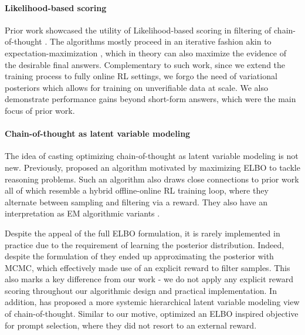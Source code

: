 \documentclass{article}
\theoremstyle{definition}
\begin{document}
\paragraph{Likelihood-based scoring}
Prior work showcased the utility of Likelihood-based scoring in filtering of chain-of-thought \citep{zelikman2024quiet,ruan2025reasoning}. The algorithms mostly proceed in an iterative fashion akin to expectation-maximization \citep{moon1996expectation}, which in theory can also maximize the evidence of the desirable final answers. Complementary to such work, since we extend the training process to fully online RL settings, we forgo the need of variational posteriors which allows for training on unverifiable data at scale. We also demonstrate performance gains beyond short-form answers, which were the main focus of prior work.

\paragraph{Chain-of-thought as latent variable modeling} The idea of casting optimizing chain-of-thought as latent variable modeling is not new. Previously, \citet{hoffman2024training} proposed an algorithm motivated by maximizing ELBO to tackle reasoning problems. Such an algorithm also draws close connections to prior work \citep{zelikman2022star,gulcehre2023reinforced,singh2023beyond,yuan2023scaling} all of which resemble a hybrid offline-online RL training loop, where they alternate between sampling and filtering via a reward. They also  have an interpretation as EM algorithmic variants \citep{moon1996expectation}.

Despite the appeal of the full ELBO formulation, it is rarely implemented in practice due to the requirement of learning the posterior distribution. Indeed, despite the formulation of \citet{hoffman2024training} they ended up approximating the posterior with MCMC, which effectively made use of an explicit reward to filter samples. This also marks a key difference from our work - we do not apply any explicit reward scoring throughout our algorithmic design and practical implementation. In addition, \citet{hu2024unveiling} has proposed a more systemic hierarchical latent variable modeling view of chain-of-thought. Similar to our motive, \citet{sordoni2024joint} optimized an ELBO inspired objective for prompt selection, where they did not resort to an external reward. 
\end{document}
